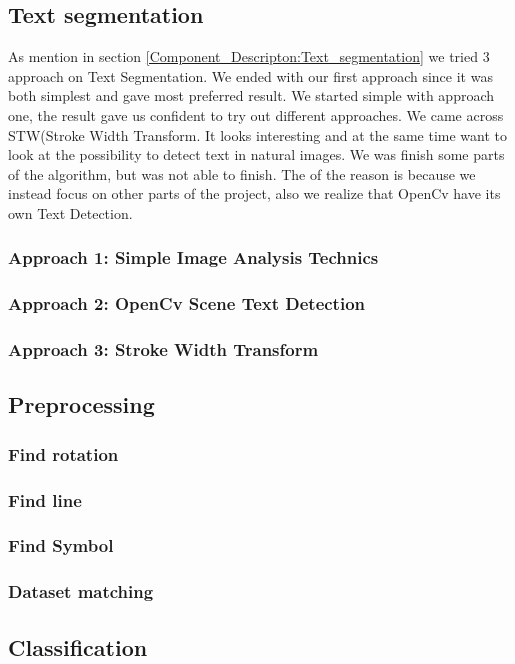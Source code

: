 \documentclass[11pt,a4paper,UKenglish]{article}
\begin{document}
\subsection{Text segmentation}
As mention in section \ref{Component_Descripton:Text_segmentation} we tried 3 approach on Text Segmentation. We ended with our first approach since it was both simplest and gave most preferred result. We started simple with approach one, the result gave us confident to try out different approaches. We came across STW(Stroke Width Transform. It looks interesting and at the same time want to look at the possibility to detect text in natural images. We was finish some parts of the algorithm, but was not able to finish. The of the reason is because we instead focus on other parts of the project, also we realize that OpenCv have its own Text Detection.

\subsubsection{Approach 1: Simple Image Analysis Technics}
\subsubsection{Approach 2: OpenCv Scene Text Detection}
\subsubsection{Approach 3: Stroke Width Transform}

\subsection{Preprocessing}
\subsubsection{Find rotation}
\subsubsection{Find line}
\subsubsection{Find Symbol}
\subsubsection{Dataset matching}

\subsection{Classification}
\end{document}
